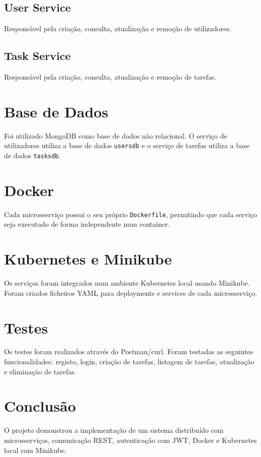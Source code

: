 \documentclass[12pt,a4paper]{article}
\begin{document}
\subsection{User Service}
Responsável pela criação, consulta, atualização e remoção de utilizadores.

\subsection{Task Service}
Responsável pela criação, consulta, atualização e remoção de tarefas.

\section{Base de Dados}
Foi utilizado MongoDB como base de dados não relacional. O serviço de utilizadores utiliza a base de dados \texttt{usersdb} e o serviço de tarefas utiliza a base de dados \texttt{tasksdb}.

\section{Docker}
Cada microsserviço possui o seu próprio \texttt{Dockerfile}, permitindo que cada serviço seja executado de forma independente num container.

\section{Kubernetes e Minikube}
Os serviços foram integrados num ambiente Kubernetes local usando Minikube. Foram criados ficheiros YAML para deployments e services de cada microsserviço.

\section{Testes}
Os testes foram realizados através do Postman/curl. Foram testadas as seguintes funcionalidades: registo, login, criação de tarefas, listagem de tarefas, atualização e eliminação de tarefas.

\section{Conclusão}
O projeto demonstrou a implementação de um sistema distribuído com microsserviços, comunicação REST, autenticação com JWT, Docker e Kubernetes local com Minikube.
\end{document}
